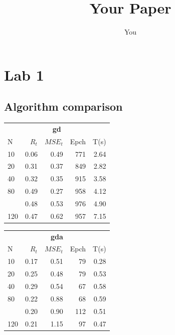 \documentclass[a4paper, 10pt]{article}
\title{Your Paper}
\author{You}
\begin{document}
\maketitle
\newpage
\section{Lab 1}
  \subsection{Algorithm comparison}
  \begin{table}[h!]
    \begin{tabular}{@{}lrrrr@{}}
      \toprule
      \multicolumn{5}{c}{\textbf{gd}} \\
      N  &   $R_t$  &  $MSE_t$ &  Epch  & T(s)\\
      \midrule
      10       &   0.06     &  0.49       &  771     & 2.64   \\
      20       &   0.31     &  0.37       &  849     & 2.82   \\
      40       &   0.32     &  0.35       &  915     & 3.58   \\
      80       &   0.49     &  0.27       &  958     & 4.12   \\
      \hdashline
      100      &   0.48     &  0.53       &  976     & 4.90   \\
      120      &   0.47     &  0.62       &  957     & 7.15   \\
      \bottomrule
    \end{tabular} 
    \hfill
    \begin{tabular}{@{}lrrrr@{}}
      \toprule
      \multicolumn{5}{c}{\textbf{gda}} \\
      N  &   $R_t$  &  $MSE_t$ &  Epch  & T(s)\\
      \midrule
      10  & 0.17    & 0.51    & 79      &  0.28   \\
      20  & 0.25    & 0.48    & 79      &  0.53   \\
      40  & 0.29    & 0.54    & 67      &  0.58   \\
      80  & 0.22    & 0.88    & 68      &  0.59   \\                 
      \hdashline
      100 & 0.20    & 0.90    & 112     &  0.51   \\
      120 & 0.21    & 1.15    & 97      &  0.47   \\
      \bottomrule
    \end{tabular} 
    \hfill
    \begin{tabular}{@{}lrrrr@{}}

\end{tabular}
\end{table}
\end{document}
